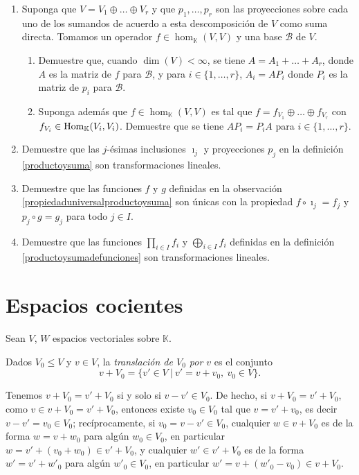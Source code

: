 \begin{enumerate}
  \item Suponga que $V=V_1\oplus\ldots\oplus V_r$ y que $p_1,\ldots,p_r$ son las proyecciones sobre cada uno de los sumandos de acuerdo a esta descomposición de $V$ como suma directa. Tomamos un operador $f\in\hom_\mathbb{K}(V,V)$ y una base $\mathcal{B}$ de $V$.
    \begin{enumerate}
      \item Demuestre que, cuando $\dim(V)<\infty$, se tiene $A=A_1+\ldots+A_r$, donde $A$ es la matriz de $f$ para $\mathcal{B}$, y para $i\in\{1,\ldots,r\}$, $A_i=AP_i$ donde $P_i$ es la matriz de $p_i$ para $\mathcal{B}$.
      \item Suponga además que $f\in\hom_\mathbb{K}(V,V)$ es tal que $f=f_{V_1}\oplus\ldots\oplus f_{V_r}$ con $f_{V_i}\in\operatorname{Hom}_\mathbb{K}(V_i,V_i)$. Demuestre que se tiene $AP_i=P_iA$ para $i\in\{1,\ldots,r\}$.
    \end{enumerate}
  \item Demuestre que las $j$-ésimas inclusiones $\imath_j$ y proyecciones $p_j$ en la definición \ref{productoysuma} son transformaciones lineales. 
  \item Demuestre que las funciones $f$ y $g$ definidas en la observación \ref{propiedaduniversalproductoysuma} son únicas con la propiedad $f\circ\imath_j=f_j$ y $p_j\circ g=g_j$ para todo $j\in I$.
  \item Demuestre que las funciones $\prod_{i\in I} f_i$ y $\bigoplus_{i\in I} f_i$ definidas en la definición \ref{productoysumadefunciones} son transformaciones lineales.
\end{enumerate}

\section{Espacios cocientes}

Sean $V$, $W$ espacios vectoriales sobre $\mathbb{K}$.

\begin{defn}
Dados $V_0\le V$ y $v\in V$, la \emph{translaci\'on de $V_0$ por $v$} es el conjunto
\[
v+V_0=\{v'\in V\ |\ v'=v+v_0,\ v_0\in V\}.
\]
\end{defn}

\begin{obs}
Tenemos $v+V_0=v'+V_0$ si y solo si $v-v'\in V_0$. De hecho, si $v+V_0=v'+V_0$, como $v\in v+V_0=v'+V_0$, entonces existe $v_0\in V_0$ tal que $v=v'+v_0$, es decir $v-v'=v_0\in V_0$; rec\'iprocamente, si $v_0=v-v'\in V_0$, cualquier $w\in v+V_0$ es de la forma $w=v+w_0$ para alg\'un $w_0\in V_0$, en particular $w=v'+(v_0+w_0)\in v'+V_0$, y cualquier $w'\in v'+V_0$ es de la forma $w'=v'+w'_0$ para alg\'un $w'_0\in V_0$, en particular $w'=v+(w'_0-v_0)\in v+V_0$.
\end{obs}

